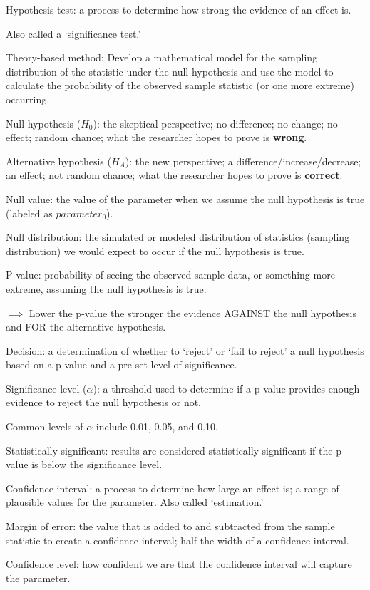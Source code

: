 \documentclass[
]{report}
\newcommand{\rgi}{\hspace{24pt}}  %
\begin{document}
Hypothesis test: a process to determine how strong the evidence of an effect is.

\rgi Also called a `significance test.'

Theory-based method: Develop a mathematical model for the sampling distribution of the statistic under the null hypothesis and use the model to calculate the probability of the observed sample statistic (or one more extreme) occurring.

Null hypothesis (\(H_0\)): the skeptical perspective; no difference; no change; no effect; random chance; what the researcher hopes to prove is \textbf{wrong}.

Alternative hypothesis (\(H_A\)): the new perspective; a difference/increase/decrease; an effect; not random chance; what the researcher hopes to prove is \textbf{correct}.

Null value: the value of the parameter when we assume the null hypothesis is true (labeled as \(parameter_0\)).

Null distribution: the simulated or modeled distribution of statistics (sampling distribution) we would expect to occur if the null hypothesis is true.

P-value: probability of seeing the observed sample data, or something more extreme, assuming the null hypothesis is true.

\(\implies\) Lower the p-value the stronger the evidence AGAINST the null hypothesis and FOR the alternative hypothesis.

Decision: a determination of whether to `reject' or `fail to reject' a null hypothesis based on a p-value and a pre-set level of significance.

Significance level (\(\alpha\)): a threshold used to determine if a p-value provides enough evidence to reject the null hypothesis or not.

\rgi Common levels of \(\alpha\) include 0.01, 0.05, and 0.10.

Statistically significant: results are considered statistically significant if the p-value is below the significance level.

Confidence interval: a process to determine how large an effect is; a range of plausible values for the parameter. Also called `estimation.'

Margin of error: the value that is added to and subtracted from the sample statistic to create a confidence interval; half the width of a confidence interval.

Confidence level: how confident we are that the confidence interval will capture the parameter.
\end{document}
